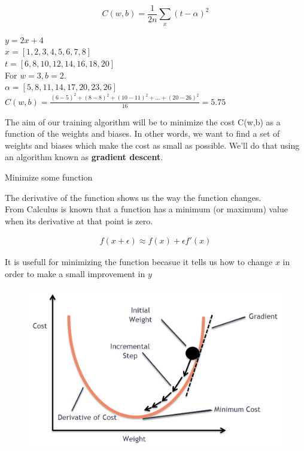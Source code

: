 \documentclass[10pt, compress]{beamer}
\begin{document}
\begin{frame}

  $$ C(w, b) = \frac{1}{2n}\sum_x (t-\alpha)^2$$

  $ y = 2x + 4$ \\
  $x = [1, 2, 3, 4, 5, 6, 7, 8]$ \\
  $t = [6, 8, 10, 12, 14, 16, 18, 20]$ \\

  For $w = 3, b = 2$. \\
  $\alpha = [5, 8, 11, 14, 17, 20, 23, 26]$ \\ \hfill \break
  $C(w, b) = \frac{(6-5)^2 + (8-8)^2 + (10-11)^2 + ... + (20-26)^2}{16} = 5.75$ \\ \hfill \break

  The aim of our training algorithm will be to minimize the cost C(w,b) as a function of the weights and biases. In other words, we want to find a set of weights and biases which make the cost as small as possible. We'll do that using an algorithm known as \textbf{gradient descent}.
\end{frame}

\begin{frame}
   Minimize some function \\
   
   \begin{multicols}{2}
     The derivative of the function shows us the way the function changes. \\
     From Calculus is known that a function has a minimum (or maximum) value when its derivative at that point is zero.

     \begin{eqnarray}
     f\left(x + \epsilon\right) \approx f\left(x\right) + \epsilon f'\left(x\right)
     \nonumber
     \end{eqnarray}
     
     It is usefull for minimizing the function becasue it tells us how to change $x$ in order to make a small improvement in $y$


     \columnbreak
     \begin{figure}
       \includegraphics[width=1\linewidth]{imgs/gd_3}
     \end{figure}
  \end{multicols}
\end{frame}
\end{document}
